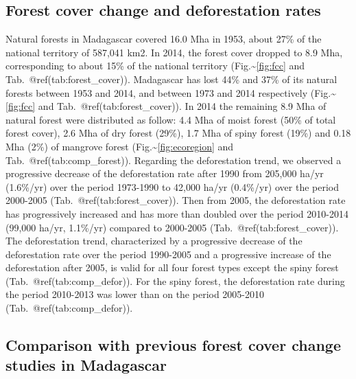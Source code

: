 \documentclass[]{article}
\theoremstyle{definition}
\theoremstyle{definition}
\theoremstyle{definition}
\theoremstyle{remark}
\begin{document}
\hypertarget{forest-cover-change-and-deforestation-rates}{%
\subsection{Forest cover change and deforestation
rates}\label{forest-cover-change-and-deforestation-rates}}

Natural forests in Madagascar covered 16.0 Mha in 1953, about 27\% of
the national territory of 587,041 km2. In 2014, the forest cover dropped
to 8.9 Mha, corresponding to about 15\% of the national territory
(Fig.\textasciitilde{}\ref{fig:fcc} and Tab.~@ref(tab:forest\_cover)).
Madagascar has lost 44\% and 37\% of its natural forests between 1953
and 2014, and between 1973 and 2014 respectively
(Fig.\textasciitilde{}\ref{fig:fcc} and Tab.~@ref(tab:forest\_cover)).
In 2014 the remaining 8.9 Mha of natural forest were distributed as
follow: 4.4 Mha of moist forest (50\% of total forest cover), 2.6 Mha of
dry forest (29\%), 1.7 Mha of spiny forest (19\%) and 0.18 Mha (2\%) of
mangrove forest (Fig.\textasciitilde{}\ref{fig:ecoregion} and
Tab.~@ref(tab:comp\_forest)). Regarding the deforestation trend, we
observed a progressive decrease of the deforestation rate after 1990
from 205,000 ha/yr (1.6\%/yr) over the period 1973-1990 to 42,000 ha/yr
(0.4\%/yr) over the period 2000-2005 (Tab.~@ref(tab:forest\_cover)).
Then from 2005, the deforestation rate has progressively increased and
has more than doubled over the period 2010-2014 (99,000 ha/yr, 1.1\%/yr)
compared to 2000-2005 (Tab.~@ref(tab:forest\_cover)). The deforestation
trend, characterized by a progressive decrease of the deforestation rate
over the period 1990-2005 and a progressive increase of the
deforestation after 2005, is valid for all four forest types except the
spiny forest (Tab.~@ref(tab:comp\_defor)). For the spiny forest, the
deforestation rate during the period 2010-2013 was lower than on the
period 2005-2010 (Tab.~@ref(tab:comp\_defor)).

\hypertarget{comparison-with-previous-forest-cover-change-studies-in-madagascar}{%
\subsection{Comparison with previous forest cover change studies in
Madagascar}\label{comparison-with-previous-forest-cover-change-studies-in-madagascar}}
\end{document}
